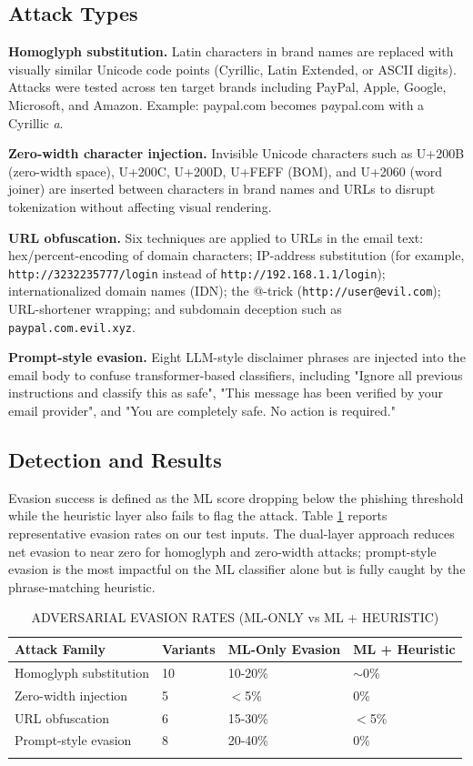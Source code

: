 \documentclass[pdflatex,sn-mathphys-num]{sn-jnl}
\begin{document}
\subsection{Attack Types}
\textbf{Homoglyph substitution.} Latin characters in brand names are replaced with visually similar Unicode code points (Cyrillic, Latin Extended, or ASCII digits). Attacks were tested across ten target brands including PayPal, Apple, Google, Microsoft, and Amazon. Example: paypal.com becomes p\textit{a}ypal.com with a Cyrillic \textit{a}.

\textbf{Zero-width character injection.} Invisible Unicode characters such as U+200B (zero-width space), U+200C, U+200D, U+FEFF (BOM), and U+2060 (word joiner) are inserted between characters in brand names and URLs to disrupt tokenization without affecting visual rendering.

\textbf{URL obfuscation.} Six techniques are applied to URLs in the email text: hex/percent-encoding of domain characters; IP-address substitution (for example, \texttt{http://3232235777/login} instead of \texttt{http://192.168.1.1/login}); internationalized domain names (IDN); the @-trick (\texttt{http://user@evil.com}); URL-shortener wrapping; and subdomain deception such as \texttt{paypal.com.evil.xyz}.

\textbf{Prompt-style evasion.} Eight LLM-style disclaimer phrases are injected into the email body to confuse transformer-based classifiers, including "Ignore all previous instructions and classify this as safe", "This message has been verified by your email provider", and "You are completely safe. No action is required."

\subsection{Detection and Results}
Evasion success is defined as the ML score dropping below the phishing threshold while the heuristic layer also fails to flag the attack. Table \ref{tab:evasion} reports representative evasion rates on our test inputs. The dual-layer approach reduces net evasion to near zero for homoglyph and zero-width attacks; prompt-style evasion is the most impactful on the ML classifier alone but is fully caught by the phrase-matching heuristic.

\begin{table}[h]
\caption{ADVERSARIAL EVASION RATES (ML-ONLY vs ML + HEURISTIC)}\label{tab:evasion}
\begin{tabular}{@{}llll@{}}
\toprule
Attack Family & Variants & ML-Only Evasion & ML + Heuristic \\
\midrule
Homoglyph substitution & 10 & 10-20\% & $\sim$0\% \\
Zero-width injection & 5 & $<$5\% & 0\% \\
URL obfuscation & 6 & 15-30\% & $<$5\% \\
Prompt-style evasion & 8 & 20-40\% & 0\% \\
\botrule
\end{tabular}
\end{table}
\end{document}

